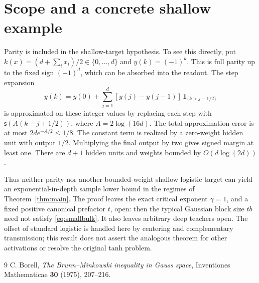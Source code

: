 \documentclass[11pt]{article}
\theoremstyle{remark}\newtheorem{remark}[theorem]{Remark}
\newcommand{\sig}{\mathsf s}
\begin{document}
\section{Scope and a concrete shallow example}

Parity is included in the shallow-target hypothesis. To see this
directly, put $k(x)=(d+\sum_i x_i)/2\in\{0,\ldots,d\}$ and
$y(k)=(-1)^k$. This is full parity up to the fixed sign $(-1)^d$,
which can be absorbed into the readout. The step expansion
\[
 y(k)=y(0)+\sum_{j=1}^d[y(j)-y(j-1)]\,\mathbf1_{\{k>j-1/2\}}
\]
is approximated on these integer values by replacing each step with
$\sig(A(k-j+1/2))$, where $A=2\log(16d)$.
The total approximation error is at most $2d e^{-A/2}\le1/8$.
The constant term is realized by a zero-weight hidden unit with output
$1/2$. Multiplying the final output by two gives signed margin at least
one. There are $d+1$ hidden units and weights bounded by $O(d\log(2d))$.

Thus neither parity nor another bounded-weight shallow logistic target
can yield an exponential-in-depth sample lower bound in the regimes
of Theorem~\ref{thm:main}. The proof leaves the exact critical exponent
$\gamma=1$, and a fixed positive canonical prefactor $t$, open: then
the typical Gaussian block size $tb$ need not satisfy
\eqref{eq:smallbulk}. It also leaves arbitrary deep teachers open.
The offset of standard logistic is handled here by centering and
complementary transmission; this result does not assert the analogous
theorem for other activations or resolve the original tanh problem.

\begin{thebibliography}{9}
C. Borell, \emph{The Brunn--Minkowski inequality in Gauss space},
Inventiones Mathematicae \textbf{30} (1975), 207--216.
\end{thebibliography}
\end{document}

